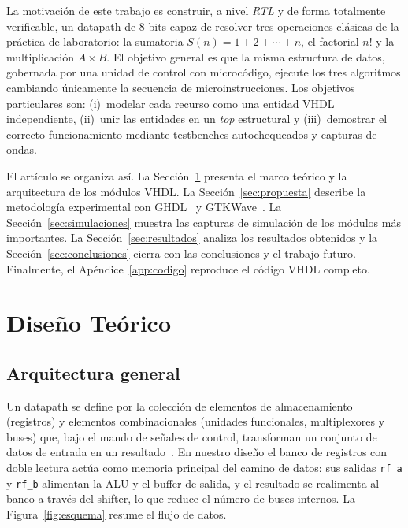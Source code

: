 \documentclass[llncs]{llncs}
\begin{document}
La motivación de este trabajo es construir, a nivel \emph{RTL} y de forma
totalmente verificable, un datapath de 8 bits capaz de resolver tres
operaciones clásicas de la práctica de laboratorio: la sumatoria
$S(n)=1+2+\cdots+n$, el factorial $n!$ y la multiplicación $A\times B$. El
objetivo general es que la misma estructura de datos, gobernada por una
unidad de control con microcódigo, ejecute los tres algoritmos cambiando
únicamente la secuencia de microinstrucciones. Los objetivos particulares
son: (i)~modelar cada recurso como una entidad VHDL independiente, (ii)~unir
las entidades en un \emph{top} estructural y (iii)~demostrar el correcto
funcionamiento mediante testbenches autochequeados y capturas de ondas.

El artículo se organiza así. La Sección~\ref{sec:diseno} presenta el marco
teórico y la arquitectura de los módulos VHDL. La
Sección~\ref{sec:propuesta} describe la metodología experimental con
GHDL~\cite{ghdl-docs} y GTKWave~\cite{gtkwave-docs}. La
Sección~\ref{sec:simulaciones} muestra las capturas de simulación de los
módulos más importantes. La Sección~\ref{sec:resultados} analiza los
resultados obtenidos y la Sección~\ref{sec:conclusiones} cierra con las
conclusiones y el trabajo futuro. Finalmente, el
Apéndice~\ref{app:codigo} reproduce el código VHDL completo.

\section{Diseño Teórico}
\label{sec:diseno}

\subsection{Arquitectura general}

Un datapath se define por la colección de elementos de almacenamiento
(registros) y elementos combinacionales (unidades funcionales, multiplexores
y buses) que, bajo el mando de señales de control, transforman un conjunto de
datos de entrada en un resultado~\cite{amdahl1964}. En nuestro diseño el
banco de registros con doble lectura actúa como memoria principal del
camino de datos: sus salidas \texttt{rf\_a} y \texttt{rf\_b} alimentan la
ALU y el buffer de salida, y el resultado se realimenta al banco a través
del shifter, lo que reduce el número de buses internos. La
Figura~\ref{fig:esquema} resume el flujo de datos.
\end{document}
